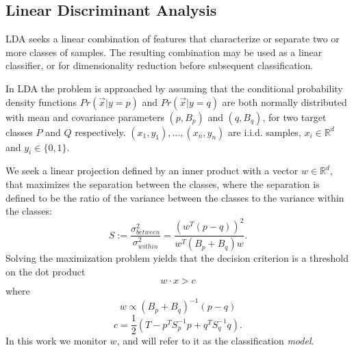 \subsection{Linear Discriminant Analysis}%
LDA seeks a linear combination of features that characterize or separate two or more classes of samples.
The resulting combination may be used as a linear classifier, or for dimensionality reduction before subsequent classification.

In LDA the problem is approached by assuming that the conditional probability
density functions $Pr(\vec x|y=p)$ and $Pr(\vec x|y=q)$ are both normally distributed with
mean and covariance parameters $(p, B_p)$ and
$(q, B_q)$, for two target classes $P$ and $Q$ respectively.
${(x_1,y_1),\ldots,(x_n,y_n)}$ are i.i.d. samples, $x_i \in \mathbb{R}^d$
and $y_i \in \{0,1\}$.

We seek a linear projection defined by an inner product with a vector $w \in \mathbb{R}^d $,
that maximizes the separation between the classes, where the separation is
defined to be the ratio of the variance between the classes to the variance
within the classes:
\begin{equation}
S := \frac{\sigma^2_{between}}{\sigma^2_{within}} = \frac{(w^T (p -
q))^2}{w^T(B_p+B_q)w}.
\end{equation}
Solving the maximization problem yields that the decision criterion is a threshold on the
dot product
\begin{equation*} \label{eq:decision}
w \cdot x > c
\end{equation*}
where
\begin{equation} \label{eq:w}
w \propto (B_p+B_q)^{-1}(p - q)
\end{equation}
\begin{equation} \label{eq:c}
c = \frac{1}{2}(T-{p}^T S_p^{-1} {p}+{q}^T S_q^{-1} {q}).
\end{equation}
In this work we monitor $w$, and will refer to it as the classification \textit{model}.

